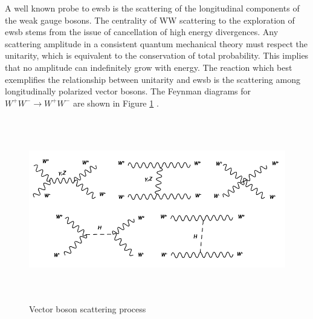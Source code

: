 A well known probe to {ewsb} is the scattering of the longitudinal components of the weak gauge bosons\cite{paper:13036335v1}.%
The centrality of WW scattering to the exploration of {ewsb} stems from the issue of cancellation of high energy divergences. Any scattering amplitude in a consistent quantum mechanical theory must respect the unitarity, which is equivalent to the conservation of total probability. This implies that no amplitude can indefinitely grow with energy. The reaction which best exemplifies the relationship between unitarity and {ewsb} is the scattering among longitudinally polarized vector bosons. The Feynman diagrams for $W^+W^-\rightarrow W^+W^-$ are shown in Figure \ref{wwscattering} \cite{report:wwscatering}.%
\begin{figure}[htb]
	\begin{center}
		\includegraphics[width=14.0cm,height=8cm]{figures/VBS/wwscattering.png}
		\caption{Vector boson scattering process}
		\label{wwscattering}
	\end{center}
\end{figure} 


